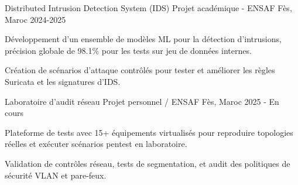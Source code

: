 
\begin{cventries}

    \cventry
    {Distributed Intrusion Detection System (IDS)} %
    {Projet académique - ENSAF} %
    {Fès, Maroc} %
    {2024-2025} %
    {
        \begin{cvitems}
            \item {Développement d'un ensemble de modèles ML pour la détection d'intrusions, précision globale de 98.1\% pour les tests sur jeu de données internes.}
            \item {Création de scénarios d'attaque contrôlés pour tester et améliorer les règles Suricata et les signatures d'IDS.}
        \end{cvitems}
    }

    \cventry
    {Laboratoire d'audit réseau} %
    {Projet personnel / ENSAF} %
    {Fès, Maroc} %
    {2025 - En cours} %
    {
        \begin{cvitems}
            \item {Plateforme de tests avec 15+ équipements virtualisés pour reproduire topologies réelles et exécuter scénarios pentest en laboratoire.}
            \item {Validation de contrôles réseau, tests de segmentation, et audit des politiques de sécurité VLAN et pare-feux.}
        \end{cvitems}
    }

\end{cventries}